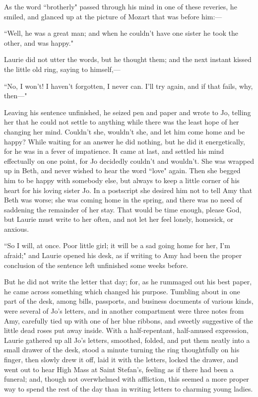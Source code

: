 As the word ``brotherly" passed through his mind in one of these
reveries, he smiled, and glanced up at the picture of Mozart that was
before him:---

``Well, he was a great man; and when he couldn't have one
sister he took the other, and was happy."

Laurie did not utter the words, but he thought them; and the next
instant kissed the little old ring, saying to himself,---

``No, I won't! I haven't forgotten, I
never can. I'll try again, and if that fails, why,
then---"

Leaving his sentence unfinished, he seized pen and paper and wrote to
Jo, telling her that he could not settle to anything while there was the
least hope of her changing her mind. Couldn't she,
wouldn't she, and let him come home and be happy? While
waiting for an answer he did nothing, but he did it energetically, for
he was in a fever of impatience. It came at last, and settled his mind
effectually on one point, for Jo decidedly couldn't and
wouldn't. She was wrapped up in Beth, and never wished
to hear the word ``love" again. Then she begged him to be happy with
somebody else, but always to keep a little corner of his heart for his
loving sister Jo. In a postscript she desired him not to tell Amy that
Beth was worse; she was coming home in the spring, and there was no need
of saddening the remainder of her stay. That would be time enough,
please God, but Laurie must write to her often, and not let her feel
lonely, homesick, or anxious.

``So I will, at once. Poor little girl; it will be a sad going home for
her, I'm afraid;" and Laurie opened his desk, as if
writing to Amy had been the proper conclusion of the sentence left
unfinished some weeks before.

But he did not write the letter that day; for, as he rummaged out his
best paper, he came across something which changed his purpose. Tumbling
about in one part of the desk, among bills, passports, and business
documents of various kinds, were several of Jo's
letters, and in another compartment were three notes from Amy, carefully
tied up with one of her blue ribbons, and sweetly suggestive of the
little dead roses put away inside. With a half-repentant, half-amused
expression, Laurie gathered up all Jo's letters,
smoothed, folded, and put them neatly into a small drawer of the desk,
stood a minute turning the ring thoughtfully on his finger, then slowly
drew it off, laid it with the letters, locked the drawer, and went out
to hear High Mass at Saint Stefan's, feeling as if there
had been a funeral; and, though not overwhelmed with affliction, this
seemed a more proper way to spend the rest of the day than in writing
letters to charming young ladies.

